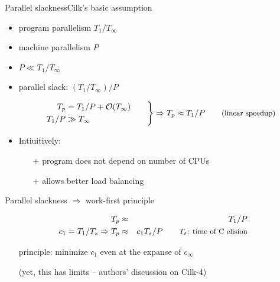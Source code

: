 \documentclass[13pt]{beamer}
\begin{document}
\begin{frame}{Parallel slackness}{Cilk's basic assumption}
    \begin{itemize}
        \item program parallelism $T_1 /  T_\infty$
        \item machine parallelism $P$

        \bigskip
        \item $P \ll T_1 / T_\infty$
        \item parallel slack: $\left( T_1 /  T_\infty \right) / P$
        \medskip

        \begin{equation*}
           \left.%
           \begin{aligned}
           T_p     &=   T_1 / P + \mathcal{O}(T_\infty) \\
           T_1 / P &\gg T_\infty \\
           \end{aligned}%
           \qquad
           \right \} \Rightarrow T_p \approx T_1 / P \qquad \text{\small(linear speedup)}
         \end{equation*}

        \medskip
        \item Intiuitively:
        \begin{itemize}
            \item[+] program does not depend on number of CPUs
            \item[+] allows better load balancing
        \end{itemize}

    \end{itemize}
\end{frame}

\begin{frame}{Parallel slackness $\Rightarrow$ work-first principle}

\begin{eqnarray*}
            T_p &\approx& T_1 / P \\
            c_1 = T_1/T_s \Rightarrow T_p &\approx& c_1 T_s / P \qquad \text{\small $T_s$: time of C elision} \\
\end{eqnarray*}

\begin{itemize}
    \item[] principle: minimize $c_1$ even at the expanse of $c_\infty$
    \item[] (yet, this has limits -- authors' discussion on Cilk-4)
\end{itemize}

\end{frame}
\end{document}
